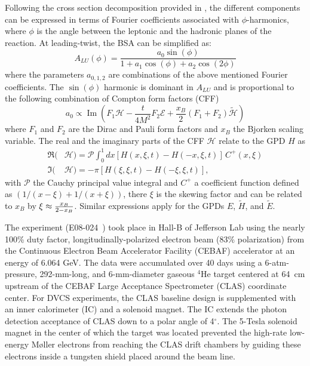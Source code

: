 \documentclass[twocolumn,nofootinbib,showpacs,prl,superscriptaddress,secnumarabic,amssymb,nobibnotes,aps,floatfix]{revtex4}
\begin{document}
Following the cross section decomposition provided in \cite{Belitsky:2001ns}, 
the different components can be expressed in terms of Fourier coefficients 
associated with $\phi$-harmonics, where $\phi$ is the angle between the 
leptonic and the hadronic planes of the reaction. At leading-twist, the 
BSA can be simplified as: 
\begin{equation}
   A_{LU}(\phi) = \frac{a_{0}\sin(\phi)}{1+a_{1}\cos(\phi)+a_{2}\cos(2\phi)}
   \label{eq:alu-simp}
\end{equation}
where the parameters $a_{0,1,2}$ are combinations of the above mentioned Fourier 
coefficients. The $\sin(\phi)$ harmonic is dominant in $A_{LU}$ 
and is proportional to the following combination of Compton form factors (CFF) 
\cite{Guidal:2013rya}
\begin{equation}
   a_{0} \propto \operatorname{Im}( F_1 \mathcal{H}- \frac{t}{4M^2} F_2 
   \mathcal{E}+ \frac{x_B}{2}(F_1+F_2)\tilde{\mathcal{H}})
\end{equation}
where $F_1$ and $F_2$ are the Dirac and Pauli form factors and $x_B$ the 
Bjorken scaling variable. The real and the imaginary parts of the CFF 
$\mathcal{H}$ relate to the GPD $H$ as  
\begin{align}
   \Re(&\mathcal{H}) = \mathcal{P} \int_{0}^{1}dx[H(x,\xi,t)-H(-x,\xi,t)] \, 
   C^{+}(x,\xi) \\
   \Im(&\mathcal{H}) = - \pi [H(\xi,\xi,t)-H(-\xi,\xi,t)],
\end{align}
with $\mathcal{P}$ the Cauchy principal value integral and $C^{+}$ a 
coefficient function defined as $(1/(x-\xi) + 1/(x+\xi))$, there $\xi$ is the 
skewing factor and can be
related to $x_B$ by $\xi\approx {{x_B}\over{2-x_B}}$. Similar expressions apply 
for the GPDs $E$, $\widetilde{H}$, and $\widetilde{E}$.


The experiment (E08-024~\cite{Hafidi:2008pr}) took place in Hall-B of Jefferson 
Lab using the nearly 100\% duty factor, longitudinally-polarized electron beam 
(83$\%$ polarization) from the Continuous Electron Beam Accelerator Facility 
(CEBAF) accelerator at an energy of 6.064 GeV. The data were accumulated over 
40 days using a 6-atm-pressure, 292-mm-long, and 6-mm-diameter gaseous $^4$He 
target centered at 64~cm upstream of the CEBAF Large Acceptance Spectrometer 
(CLAS) coordinate center. For DVCS experiments, the CLAS baseline design 
\cite{Mecking:2003zu} is supplemented with an inner calorimeter (IC) and a 
solenoid magnet. The IC extends the photon detection acceptance of CLAS down 
to a polar angle of 4$^{\circ}$. The 5-Tesla solenoid magnet in the center of 
which the target was located prevented the high-rate low-energy M{\o}ller 
electrons from reaching the CLAS drift chambers by guiding these electrons 
inside a tungsten shield placed around the beam line. 
\end{document}
